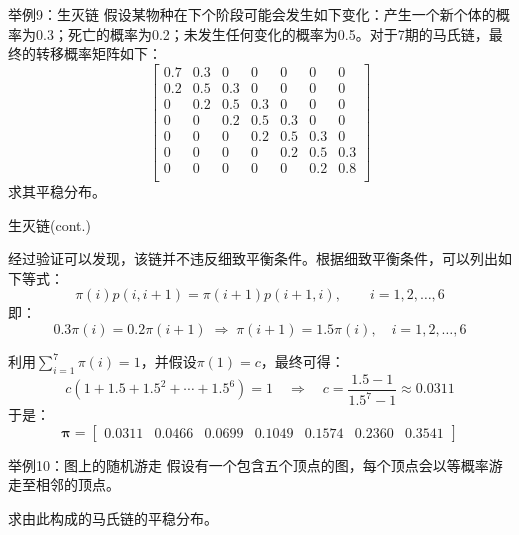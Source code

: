 \documentclass[t]{beamer}
\begin{document}
\begin{frame}{举例9：生灭链}
    假设某物种在下个阶段可能会发生如下变化：产生一个新个体的概率为0.3；死亡的概率为0.2；未发生任何变化的概率为0.5。对于7期的马氏链，最终的转移概率矩阵如下：
    \[\begin{bmatrix}
    0.7 & 0.3 & 0 & 0 & 0 & 0 & 0\\ 
    0.2 & 0.5 & 0.3 & 0 & 0 & 0 & 0\\ 
    0 & 0.2 & 0.5 & 0.3 & 0 & 0 & 0\\ 
    0 & 0 & 0.2 & 0.5 & 0.3 & 0 & 0\\ 
    0 & 0 & 0 & 0.2 & 0.5 & 0.3 & 0\\ 
    0 & 0 & 0 & 0 & 0.2 & 0.5 & 0.3\\ 
    0 & 0 & 0 & 0 & 0 & 0.2 & 0.8\\ 
    \end{bmatrix} \]
    求其平稳分布。
\end{frame}


\begin{frame}{生灭链(cont.)}
    \begin{spacing}{1}
      \small
    经过验证可以发现，该链并不违反细致平衡条件。根据细致平衡条件，可以列出如下等式：
    \[\pi(i)p(i,i+1)=\pi(i+1)p(i+1,i),\qquad i=1,2,\ldots,6 \]
    即：$$0.3\pi(i)=0.2\pi(i+1)\;\Rightarrow\; \pi(i+1)=1.5\pi(i), \quad i=1,2,\ldots,6$$
    
    利用$\displaystyle\sum_{i=1}^7 \pi(i)=1$，并假设$\pi(1)=c$，最终可得：
    \[c\left(1+1.5+1.5^2+\cdots+1.5^6\right)=1\quad \Rightarrow\quad c=\frac{1.5-1}{1.5^7-1}\approx 0.0311 \]
    于是：$$\bm{\pi}=\begin{bmatrix}
    0.0311& 0.0466& 0.0699& 0.1049& 0.1574& 0.2360& 0.3541 
    \end{bmatrix}$$  
    \end{spacing}
\end{frame}


\begin{frame}{举例10：图上的随机游走}
    假设有一个包含五个顶点的图，每个顶点会以等概率游走至相邻的顶点。
\begin{center}
        \end{center}
    求由此构成的马氏链的平稳分布。
        
\end{frame}
\end{document}
